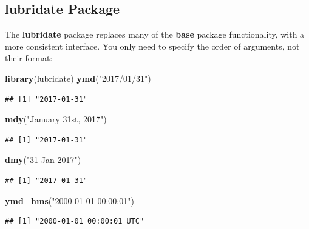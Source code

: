 \documentclass[]{book}
\newenvironment{Shaded}{\begin{snugshade}}{\end{snugshade}}
\newcommand{\KeywordTok}[1]{\textcolor[rgb]{0.13,0.29,0.53}{\textbf{#1}}}
\newcommand{\NormalTok}[1]{#1}
\newcommand{\StringTok}[1]{\textcolor[rgb]{0.31,0.60,0.02}{#1}}
\theoremstyle{definition}
\theoremstyle{definition}
\theoremstyle{definition}
\theoremstyle{remark}
\begin{document}
\hypertarget{lubridate-package}{%
\subsection{lubridate Package}\label{lubridate-package}}

The \textbf{lubridate} package replaces many of the \textbf{base} package functionality, with a more consistent interface.
You only need to specify the order of arguments, not their format:

\begin{Shaded}
\begin{Highlighting}[]
\KeywordTok{library}\NormalTok{(lubridate)}
\KeywordTok{ymd}\NormalTok{(}\StringTok{"2017/01/31"}\NormalTok{)}
\end{Highlighting}
\end{Shaded}

\begin{verbatim}
## [1] "2017-01-31"
\end{verbatim}

\begin{Shaded}
\begin{Highlighting}[]
\KeywordTok{mdy}\NormalTok{(}\StringTok{"January 31st, 2017"}\NormalTok{)}
\end{Highlighting}
\end{Shaded}

\begin{verbatim}
## [1] "2017-01-31"
\end{verbatim}

\begin{Shaded}
\begin{Highlighting}[]
\KeywordTok{dmy}\NormalTok{(}\StringTok{"31-Jan-2017"}\NormalTok{)}
\end{Highlighting}
\end{Shaded}

\begin{verbatim}
## [1] "2017-01-31"
\end{verbatim}

\begin{Shaded}
\begin{Highlighting}[]
\KeywordTok{ymd_hms}\NormalTok{(}\StringTok{"2000-01-01 00:00:01"}\NormalTok{)}
\end{Highlighting}
\end{Shaded}

\begin{verbatim}
## [1] "2000-01-01 00:00:01 UTC"
\end{verbatim}
\end{document}
